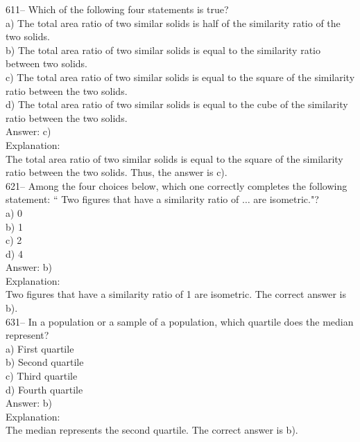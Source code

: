 \documentclass[letterpaper, 12pt]{article}
\begin{document}
611-- Which of the following four statements is true?\\

a) The total area ratio of two similar solids is half of the
similarity ratio of the two solids.\\
b) The total area ratio of two similar solids is equal to the similarity ratio
between two solids.\\
c) The total area ratio of two similar solids is equal to the square of the similarity
ratio between the two solids.\\
d) The total area ratio of two similar solids is equal to the cube of the similarity ratio between the two solids.\\

Answer: c)\\

Explanation: \\
The total area ratio of two similar solids is equal to the square of the similarity ratio between the two solids.
Thus, the answer is c).\\

621-- Among the four choices below, which one correctly completes the following statement: `` Two figures that have a similarity ratio of $\ldots$ are isometric."?\\
a) 0\\
b) 1\\
c) 2\\
d) 4\\

Answer: b) \\

Explanation: \\
Two figures that have a similarity ratio of 1 are isometric. The correct answer is b).\\

631-- In a population or a sample of a population, which quartile does the median represent?\\

a) First quartile\\
b) Second quartile\\
c) Third quartile\\
d) Fourth quartile\\

Answer: b)\\

Explanation: \\
The median represents the second quartile. The correct answer is  b).\\
\end{document}
